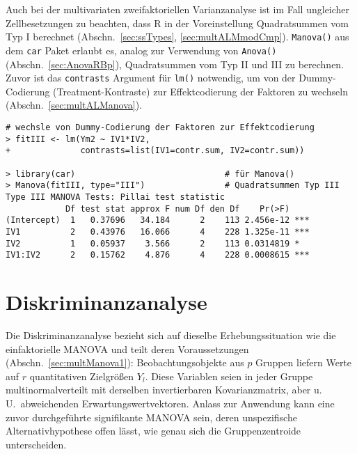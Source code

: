 Auch bei der multivariaten zweifaktoriellen Varianzanalyse ist im Fall ungleicher Zellbesetzungen zu beachten, dass R in der Voreinstellung Quadratsummen vom Typ I berechnet (Abschn.\ \ref{sec:ssTypes}, \ref{sec:multALMmodCmp}). \lstinline!Manova()! aus dem  \lstinline!car! Paket erlaubt es, analog zur Verwendung von \lstinline!Anova()! (Abschn.\ \ref{sec:AnovaRBp}), Quadratsummen vom Typ II und III zu berechnen. Zuvor ist das \lstinline!contrasts! Argument für \lstinline!lm()! notwendig, um von der Dummy-Codierung (Treatment-Kontraste) zur Effektcodierung der Faktoren zu wechseln (Abschn.\ \ref{sec:multALManova}).
\begin{lstlisting}
# wechsle von Dummy-Codierung der Faktoren zur Effektcodierung
> fitIII <- lm(Ym2 ~ IV1*IV2,
+              contrasts=list(IV1=contr.sum, IV2=contr.sum))

> library(car)                              # für Manova()
> Manova(fitIII, type="III")                # Quadratsummen Typ III
Type III MANOVA Tests: Pillai test statistic
            Df test stat approx F num Df den Df    Pr(>F)    
(Intercept)  1   0.37696   34.184      2    113 2.456e-12 ***
IV1          2   0.43976   16.066      4    228 1.325e-11 ***
IV2          1   0.05937    3.566      2    113 0.0314819 *  
IV1:IV2      2   0.15762    4.876      4    228 0.0008615 ***
\end{lstlisting}

\section{Diskriminanzanalyse}
\label{sec:multDA}

Die Diskriminanzanalyse bezieht sich auf dieselbe Erhebungssituation wie die einfaktorielle MANOVA und teilt deren Voraussetzungen (Abschn.\ \ref{sec:multManova1}): Beobachtungsobjekte aus $p$ Gruppen liefern Werte auf $r$ quantitativen Zielgrößen $Y_{l}$. Diese Variablen seien in jeder Gruppe multinormalverteilt mit derselben invertierbaren Kovarianzmatrix, aber u.\,U.\ abweichenden Erwartungswertvektoren. Anlass zur Anwendung kann eine zuvor durchgeführte signifikante MANOVA sein, deren unspezifische Alternativhypothese offen lässt, wie genau sich die Gruppenzentroide unterscheiden.

